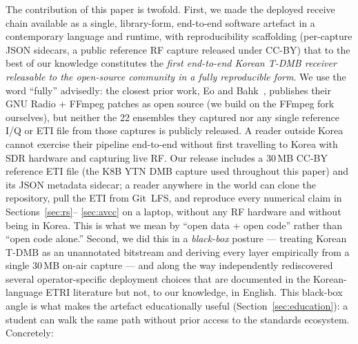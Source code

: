 \documentclass[11pt,a4paper]{article}
\begin{document}
The contribution of this paper is twofold.  First, we made the
deployed receive chain available as a single, library-form,
end-to-end software artefact in a contemporary language and
runtime, with reproducibility scaffolding (per-capture JSON
sidecars, a public reference RF capture released under CC-BY)
that to the best of our knowledge constitutes the \emph{first
end-to-end Korean T-DMB receiver releasable to the open-source
community in a fully reproducible form}.  We use the word
``fully'' advisedly: the closest prior work, Eo and
Bahk~\cite{eo2024tdmb}, publishes their GNU Radio + FFmpeg
patches as open source (we build on the FFmpeg fork ourselves),
but neither the 22 ensembles they captured nor any single
reference I/Q or ETI file from those captures is publicly
released.  A reader outside Korea cannot exercise their pipeline
end-to-end without first travelling to Korea with SDR hardware
and capturing live RF.  Our release includes a 30\,MB CC-BY
reference ETI file (the K8B YTN DMB capture used throughout this
paper) and its JSON metadata sidecar; a reader anywhere in the
world can clone the repository, pull the ETI from Git~LFS, and
reproduce every numerical claim in Sections~\ref{sec:rs}--%
\ref{sec:avcc} on a laptop, without any RF hardware and without
being in Korea.  This is what we mean by ``open data + open
code'' rather than ``open code alone.''  Second, we did this in a \emph{black-box}
posture --- treating Korean T-DMB as an unannotated bitstream and
deriving every layer empirically from a single 30\,MB on-air
capture --- and along the way independently rediscovered several
operator-specific deployment choices that are documented in the
Korean-language ETRI literature but not, to our knowledge, in
English.  This black-box angle is what makes the artefact
educationally useful (Section~\ref{sec:education}): a student can
walk the same path without prior access to the standards
ecosystem.  Concretely:
\end{document}
